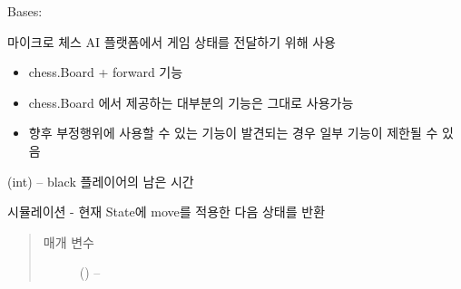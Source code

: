 \documentclass[letterpaper,10pt,english]{sphinxmanual}
\begin{document}
\begin{fulllineitems}
\label{\detokenize{scripts:scripts.run_game.State}}
Bases: 

마이크로 체스 AI 플랫폼에서 게임 상태를 전달하기 위해 사용
\begin{itemize}
\item {} 
chess.Board + forward 기능

\item {} 
chess.Board 에서 제공하는 대부분의 기능은 그대로 사용가능

\item {} 
향후 부정행위에 사용할 수 있는 기능이 발견되는 경우 일부 기능이 제한될 수 있음

\end{itemize}

\begin{fulllineitems}
\label{\detokenize{scripts:scripts.run_game.State.black_remain_sec}}
(int) -- black 플레이어의 남은 시간

\end{fulllineitems}


\begin{fulllineitems}
\label{\detokenize{scripts:scripts.run_game.State.color}}
\end{fulllineitems}


\begin{fulllineitems}
\label{\detokenize{scripts:scripts.run_game.State.forward}}
시뮬레이션
- 현재 State에 move를 적용한 다음 상태를 반환
\begin{quote}\begin{description}
\item[{매개 변수}] \leavevmode
{} ({\hyperref[\detokenize{scripts:scripts.run_game.Move}]{}}) -- 


\end{description}
\end{quote}
\end{fulllineitems}
\end{fulllineitems}
\end{document}
